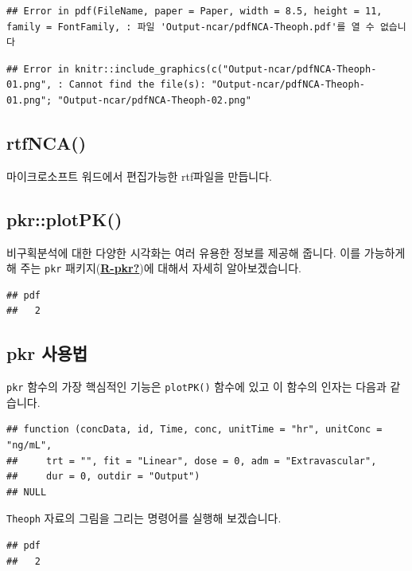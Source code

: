 \documentclass[
  11pt,
  krantz2, a4paper, twoside]{krantz}
\begin{document}
\begin{verbatim}
## Error in pdf(FileName, paper = Paper, width = 8.5, height = 11, family = FontFamily, : 파일 'Output-ncar/pdfNCA-Theoph.pdf'를 열 수 없습니다
\end{verbatim}

\begin{verbatim}
## Error in knitr::include_graphics(c("Output-ncar/pdfNCA-Theoph-01.png", : Cannot find the file(s): "Output-ncar/pdfNCA-Theoph-01.png"; "Output-ncar/pdfNCA-Theoph-02.png"
\end{verbatim}

\hypertarget{rtfnca}{%
\subsection{rtfNCA()}\label{rtfnca}}

마이크로소프트 워드에서 편집가능한 rtf파일을 만듭니다.

\hypertarget{pkrplotpk}{%
\subsection{pkr::plotPK()}\label{pkrplotpk}}

비구획분석에 대한 다양한 시각화는 여러 유용한 정보를 제공해 줍니다.
이를 가능하게 해 주는 \texttt{pkr} 패키지(\protect\hyperlink{ref-R-pkr}{\textbf{R-pkr?}})에 대해서 자세히 알아보겠습니다.

\begin{verbatim}
## pdf 
##   2
\end{verbatim}

\hypertarget{pkr-manual}{%
\subsection{pkr 사용법}\label{pkr-manual}}

\texttt{pkr} 함수의 가장 핵심적인 기능은 \texttt{plotPK()} 함수에 있고 이 함수의 인자는 다음과 같습니다.

\begin{verbatim}
## function (concData, id, Time, conc, unitTime = "hr", unitConc = "ng/mL", 
##     trt = "", fit = "Linear", dose = 0, adm = "Extravascular", 
##     dur = 0, outdir = "Output") 
## NULL
\end{verbatim}

\texttt{Theoph} 자료의 그림을 그리는 명령어를 실행해 보겠습니다.

\begin{verbatim}
## pdf 
##   2
\end{verbatim}
\end{document}
